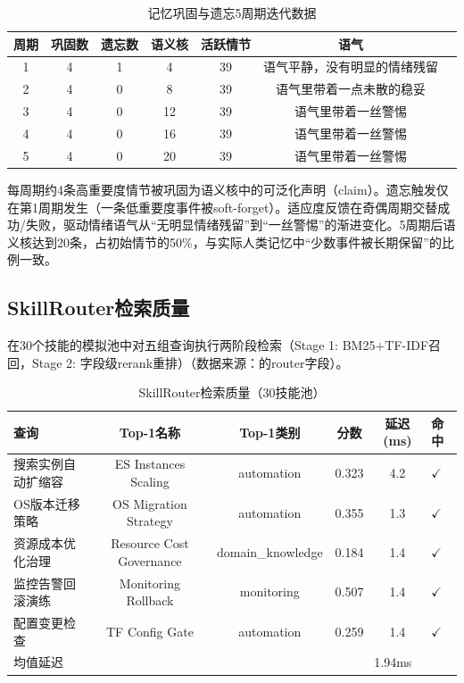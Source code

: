 \documentclass[12pt,a4paper]{ctexart}
\begin{document}
\begin{table}[H]
\centering
\caption{记忆巩固与遗忘5周期迭代数据}
\label{tab:mem_cycles}
\begin{tabular}{ccccccl}
\toprule
周期 & 巩固数 & 遗忘数 & 语义核 & 活跃情节 & 语气 \\
\midrule
1 & 4 & 1 & 4  & 39 & 语气平静，没有明显的情绪残留 \\
2 & 4 & 0 & 8  & 39 & 语气里带着一点未散的稳妥 \\
3 & 4 & 0 & 12 & 39 & 语气里带着一丝警惕 \\
4 & 4 & 0 & 16 & 39 & 语气里带着一丝警惕 \\
5 & 4 & 0 & 20 & 39 & 语气里带着一丝警惕 \\
\bottomrule
\end{tabular}
\end{table}

每周期约4条高重要度情节被巩固为语义核中的可泛化声明（claim）。遗忘触发仅在第1周期发生（一条低重要度事件被soft-forget）。适应度反馈在奇偶周期交替成功/失败，驱动情绪语气从“无明显情绪残留”到“一丝警惕”的渐进变化。5周期后语义核达到20条，占初始情节的50\%，与实际人类记忆中“少数事件被长期保留”的比例一致。

\subsection{SkillRouter检索质量}

在30个技能的模拟池中对五组查询执行两阶段检索（Stage 1: BM25+TF-IDF召回，Stage 2: 字段级rerank重排）（数据来源：的router字段）。

\begin{table}[H]
\centering
\caption{SkillRouter检索质量（30技能池）}
\label{tab:router}
\begin{tabular}{lccccl}
\toprule
查询 & Top-1名称 & Top-1类别 & 分数 & 延迟(ms) & 命中 \\
\midrule
搜索实例自动扩缩容       & ES Instances Scaling  & automation      & 0.323 & 4.2 & $\checkmark$ \\
OS版本迁移策略           & OS Migration Strategy & automation      & 0.355 & 1.3 & $\checkmark$ \\
资源成本优化治理         & Resource Cost Governance & domain\_knowledge & 0.184 & 1.4 & $\checkmark$ \\
监控告警回滚演练         & Monitoring Rollback   & monitoring      & 0.507 & 1.4 & $\checkmark$ \\
配置变更检查             & TF Config Gate        & automation      & 0.259 & 1.4 & $\checkmark$ \\
\bottomrule
\multicolumn{3}{l}{均值延迟} & \multicolumn{3}{c}{1.94ms} \\
\bottomrule
\end{tabular}
\end{table}
\end{document}
